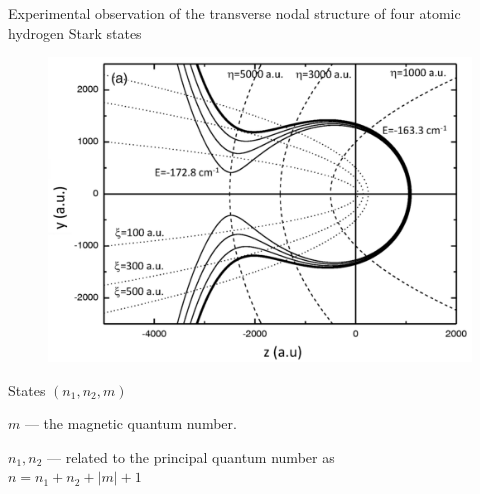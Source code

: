 Experimental observation of the transverse nodal structure of four atomic hydrogen Stark states
\begin{minipage}{0.55\textwidth}
    \begin{figure}[h]
        \centering
        \includegraphics[width=1.1\textwidth]{figures/parabola.png}
    \end{figure}
\end{minipage}
\hfill
\begin{minipage}{0.35\textwidth}
         States $(n_1,n_2,m)$ 

        \cmark $m$ --- the magnetic quantum number. 

        \cmark $n_1, n_2$ --- related to the principal quantum number as\\
        $
            n = n_1 + n_2 + |m| + 1
        $
\end{minipage}


